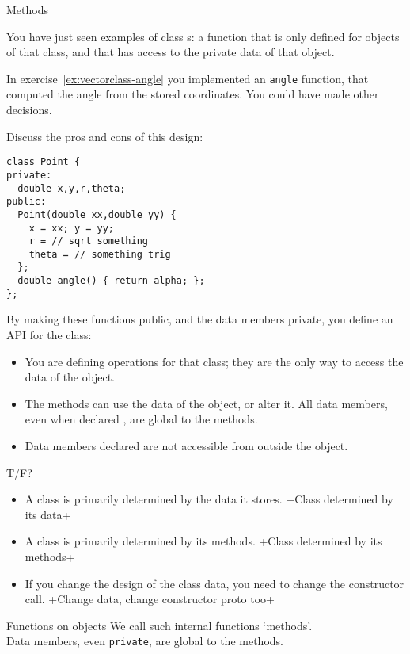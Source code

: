  {Methods}

You have just seen examples of class
s: a function that is only defined for objects of
that class, and that has access to the private data of that object.

In exercise~\ref{ex:vectorclass-angle} you implemented an \lstinline{angle} function,
that computed the angle from the stored coordinates.
You could have made other decisions.

\begin{exercise}
  \label{ex:vectorclass-redundant}
  Discuss the pros and cons of this design:
  \lstset{style=snippetcode}
\begin{lstlisting}
class Point {
private:
  double x,y,r,theta;
public:
  Point(double xx,double yy) {
    x = xx; y = yy;
    r = // sqrt something
    theta = // something trig
  };
  double angle() { return alpha; };
};
\end{lstlisting}
\end{exercise}

By making these functions public, and the data members
private, you define an \acf{API} for the class:
\begin{itemize}
\item You are defining operations for that class; they are the only
  way to access the data of the object.
\item The methods can use the data of the object, or alter it. All
  data members, even when declared , are global to the methods.
\item  Data members declared  are not accessible from outside the
  object.
\end{itemize}

\begin{review}
  \label{rev:class-meth-data}
  T/F?
  \begin{itemize}
  \item A class is primarily determined by the data it stores.
    \slackpollTF+Class determined by its data+
  \item A class is primarily determined by its methods.
    \slackpollTF+Class determined by its methods+
  \item If you change the design of the class data,
    you need to change the constructor call.
    \slackpollTF+Change data, change constructor proto too+
  \end{itemize}
\end{review}

\begin{slide}{Functions on objects}
  \label{sl:obj-func}
  We call such internal functions `methods'.\\
  Data members, even \lstinline{private}, are global to the methods.
\end{slide}

